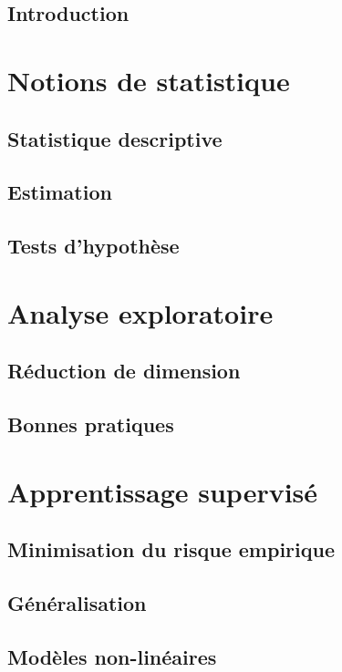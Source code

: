 \documentclass[french,11pt,openany]{book}
\begin{document}
\chapter{Introduction}


\part{Notions de statistique}
\chapter{Statistique descriptive}

\clearpage 

\chapter{Estimation}

\clearpage

\chapter{Tests d'hypothèse}


\part{Analyse exploratoire}
\vspace{1cm}
\chapter{Réduction de dimension}

\clearpage 

\chapter{Bonnes pratiques}


\part{Apprentissage supervisé}
\chapter{Minimisation du risque empirique}

\clearpage 

\chapter{Généralisation}

\clearpage 

\chapter{Modèles non-linéaires}

\clearpage 
\end{document}
